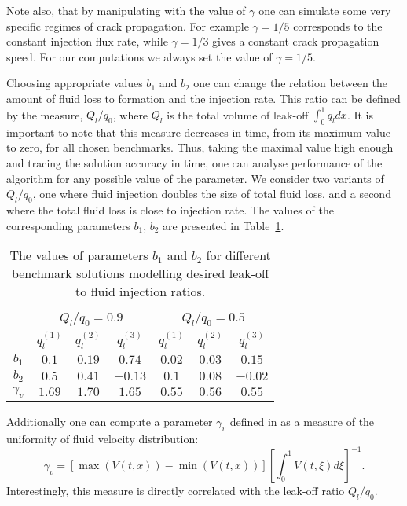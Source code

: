 Note also, that by manipulating with the value of $\gamma$ one can
simulate some very specific regimes of crack propagation. For
example $\gamma=1/5$ corresponds to the constant injection flux
rate, while $\gamma=1/3$ gives a constant crack propagation speed.
For our computations we always
set the value of $\gamma=1/5$.

Choosing appropriate values $b_1$ and $b_2$ one can change the relation between the amount of fluid loss to formation and the injection rate. This ratio can be defined by the  measure, $Q_l/q_0$, where $Q_l$ is the total volume of leak-off $\int_0^1 q_l dx$.
It is important to note that this measure decreases in time, from its maximum value to zero, for all chosen benchmarks. Thus, taking the maximal value high enough and tracing the solution accuracy in time, one can analyse performance of the algorithm for any possible value of the parameter. We consider two variants of $Q_l/q_0$,
one where fluid injection doubles the size of total fluid loss, and a second where the total fluid loss is close to injection rate.
The values of the corresponding parameters $b_1$, $b_2$ are presented in Table~\ref{tab_last}.
\begin{table}[h]
\centering
\begin{tabular}{c|c|c|c|c|c|c|}
\cline{2-7}
& \multicolumn{3}{c|}{$Q_l/q_0=0.9$ } & \multicolumn{3}{c|}{$Q_l/q_0=0.5$} \\ [.05in]\cline{2-7}
& $q_l^{(1)}$ & $q_l^{(2)}$ & $q_l^{(3)}$ & $q_l^{(1)}$ & $q_l^{(2)}$ & $q_l^{(3)}$ \\ [.05in]\cline{1-7}
\multicolumn{1}{|c|}{$b_1$} & $0.1$ & $0.19$ & $0.74$ &$0.02$& $0.03$& $0.15$ \\[.02in]\cline{1-7}
\multicolumn{1}{|c|}{$b_2$} &$0.5$ & $0.41$& $-0.13$ &$0.1$& $0.08$& $-0.02$ \\ \cline{1-7}
\multicolumn{1}{|c|}{ $\gamma_v$} &$1.69$ & $1.70$& $1.65$ &$0.55$& $0.56$& $0.55$ \\ \cline{1-7}
\end{tabular}
\caption{The values of parameters $b_1$ and $b_2$ for different benchmark solutions modelling desired leak-off to fluid injection ratios.}
\label{tab_last}
\end{table}



Additionally one can compute a parameter $\gamma_v$ defined in \cite{MWL} as a measure of the uniformity of fluid velocity distribution:
\begin{equation}
\label{gamma_v}
\gamma_v=\left[\max(V(t,x))-\min(V(t,x))\right]\left[\int_0^1V(t,\xi)d\xi\right]^{-1}.
\end{equation}
Interestingly, this measure is directly correlated with the leak-off ratio $Q_l/q_0$.

